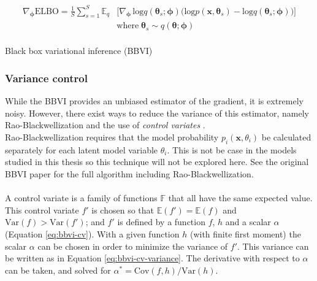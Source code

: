 \begin{equation}
    \label{eq:bbvi-mc}
    \begin{split}
        \nabla_{\bm{\phi}}\mathrm{ELBO} = \frac{1}{S} \sum^S_{s=1}\mathbb{E}_q & \Big[ \nabla_{\bm{\phi}} \, \mathrm{log}q(\bm\theta_s; \bm\phi) \big( \mathrm{log}p(\bm{x}, \bm\theta_s) - \mathrm{log}q(\bm\theta_s; \bm\phi) \big) \Big] \\
        & \mathrm{where} \; \bm\theta_s \sim q(\bm\theta; \bm\phi) \\
    \end{split}
\end{equation}


\begin{algorithm}
    \caption{Black box variational inference (BBVI)}
    \label{alg:bbvi}
\end{algorithm}


\subsubsection{Variance control}
While the BBVI provides an unbiased estimator of the gradient, it is extremely noisy. However, there exist ways to reduce the variance of this estimator, namely Rao-Blackwellization \parencite{rao-blackwell} and the use of \textit{control variates} \parencite{control-variate}. 
\\
Rao-Blackwellization requires that the model probability $p_i(\bm{x}, \theta_i)$ be calculated separately for each latent model variable $\theta_i$. This is not be case in the models studied in this thesis so this technique will not be explored here. See the original BBVI paper \parencite{BBVI} for the full algorithm including Rao-Blackwellization.
\\
\\
A control variate is a family of functions $\mathbb{F}$ that all have the same expected value. This control variate $f'$ is chosen so that $\mathbb{E}(f') = \mathbb{E}(f)$ and $\mathrm{Var}(f) > \mathrm{Var}(f')$; and $f'$ is defined by a function $f$, $h$ and a scalar $\alpha$ (Equation \ref{eq:bbvi-cv}). With a given function $h$ (with finite first moment) the scalar $\alpha$ can be chosen in order to minimize the variance of $f'$. This variance can be written as in Equation \ref{eq:bbvi-cv-variance}. The derivative with respect to $\alpha$ can be taken, and solved for $\alpha^* = \mathrm{Cov}(f, h) / \mathrm{Var}(h)$.

